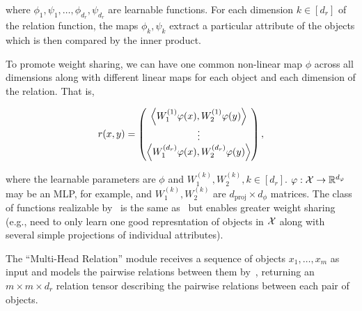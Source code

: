\noindent where $\phi_1, \psi_1, \ldots, \phi_{d_r}, \psi_{d_r}$ are learnable functions. For each dimension $k \in [d_r]$ of the relation function, the maps $\phi_k, \psi_k$ extract a particular attribute of the objects which is then compared by the inner product.

To promote weight sharing, we can have one common non-linear map $\phi$ across all dimensions along with different linear maps for each object and each dimension of the relation. That is,

\begin{equation}\label{eq:relation_function_lin_proj}
    r(x, y) = \begin{pmatrix}
        \left \langle W_1^{(1)}\varphi(x), W_2^{(1)}\varphi(y) \right\rangle \\
        \vdots \\
        \left \langle W_1^{(d_r)}\varphi(x), W_2^{(d_r)}\varphi(y) \right\rangle \\
    \end{pmatrix},
\end{equation}

\noindent where the learnable parameters are $\phi$ and $W_1^{(k)}, W_2^{(k)}, k \in [d_r]$. $\varphi: {\mathcal{X}} \to \mathbb{R}^{d_\varphi}$ may be an MLP, for example, and $W_1^{(k)}, W_2^{(k)}$ are $d_{\mathrm{proj}} \times d_\phi$ matrices. The class of functions realizable by~ is the same as~ but enables greater weight sharing (e.g., need to only learn one good represntation of objects in ${\mathcal{X}}$ along with several simple projections of individual attributes).

The ``Multi-Head Relation'' module receives a sequence of objects $x_1, \ldots, x_m$ as input and models the pairwise relations between them by~, returning an $m \times m \times d_r$ relation tensor describing the pairwise relations between each pair of objects.

% 